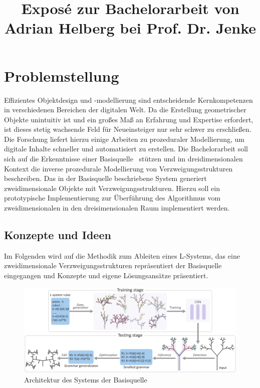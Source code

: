\documentclass[11pt]{article}
\title{\textbf{Exposé} zur Bachelorarbeit von Adrian Helberg bei Prof. Dr. Jenke}
\begin{document}
    \maketitle

    \section{Problemstellung}

    Effizientes Objektdesign und -modellierung sind entscheidende Kernkompetenzen in verschiedenen Bereichen der
    digitalen Welt.
    Da die Erstellung geometrischer Objekte unintuitiv ist und ein großes Maß an Erfahrung und Expertise
    erfordert, ist dieses stetig wachsende Feld für Neueinsteiger nur sehr schwer zu erschließen.
    Die Forschung liefert hierzu einige Arbeiten zu prozeduraler Modellierung, um digitale Inhalte schneller und
    automatisiert zu erstellen.
    Die Bachelorarbeit soll sich auf die Erkenntnisse einer Basisquelle~\cite{basisquelle} stützen und im
    dreidimensionalen Kontext die inverse prozedurale Modellierung von Verzweigungsstrukturen beschreiben.
    Das in der Basisquelle beschriebene System generiert zweidimensionale Objekte mit Verzweigungsstrukturen.
    Hierzu soll ein prototypische Implementierung zur Überführung des Algorithmus vom zweidimensionalen in den
    dreisimensionalen Raum implementiert werden.

    \newpage

    \subsection{Konzepte und Ideen}
    Im Folgenden wird auf die Methodik zum Ableiten eines L-Systems, das eine zweidimensionale Verzweigungsstrukturen
    repräsentiert der Basisquelle~\cite{basisquelle} eingegangen und Konzepte und eigene Lösungsansätze präsentiert.

    \begin{figure}[H]
       \centering
       \includegraphics[width=14cm]{../images/System_2D.PNG}
       \caption[Systemarchitektur 2D]{Architektur des Systems der Basisquelle~\cite{basisquelle}}
    \end{figure}
\end{document}
